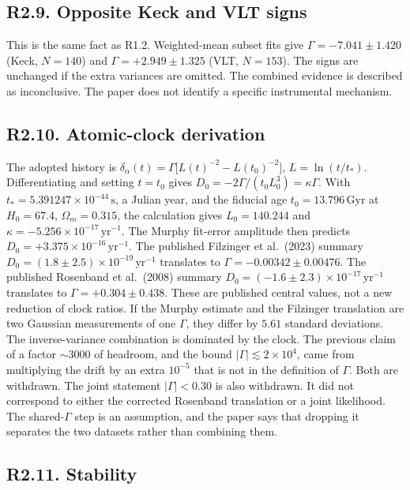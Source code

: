\documentclass[11pt]{article}
\begin{document}
\subsection*{R2.9. Opposite Keck and VLT signs}

This is the same fact as R1.2.
Weighted-mean subset fits give $\Gamma=-7.041\pm1.420$ (Keck, $N=140$) and $\Gamma=+2.949\pm1.325$ (VLT, $N=153$).
The signs are unchanged if the extra variances are omitted.
The combined evidence is described as inconclusive.
The paper does not identify a specific instrumental mechanism.

\subsection*{R2.10. Atomic-clock derivation}

The adopted history is
$\delta_{\alpha}(t)=\Gamma\big[L(t)^{-2}-L(t_{0})^{-2}\big]$,
$L=\ln(t/t_{*})$.
Differentiating and setting $t=t_{0}$ gives
$D_{0}=-2\Gamma/(t_{0} L_{0}^{3})=\kappa\Gamma$.
With $t_{*}=5.391247\times10^{-44}\,\mathrm{s}$, a Julian year, and the fiducial age $t_{0}=13.796\,\mathrm{Gyr}$ at $H_{0}=67.4$, $\Omega_{m}=0.315$, the calculation gives $L_{0}=140.244$ and $\kappa=-5.256\times10^{-17}\,\mathrm{yr}^{-1}$.
The Murphy fit-error amplitude then predicts $D_{0}=+3.375\times10^{-16}\,\mathrm{yr}^{-1}$.
The published Filzinger et al.\ (2023) summary $D_{0}=(1.8\pm2.5)\times10^{-19}\,\mathrm{yr}^{-1}$ translates to $\Gamma=-0.00342\pm0.00476$.
The published Rosenband et al.\ (2008) summary $D_{0}=(-1.6\pm2.3)\times10^{-17}\,\mathrm{yr}^{-1}$ translates to $\Gamma=+0.304\pm0.438$.
These are published central values, not a new reduction of clock ratios.
If the Murphy estimate and the Filzinger translation are two Gaussian measurements of one $\Gamma$, they differ by $5.61$ standard deviations.
The inverse-variance combination is dominated by the clock.
The previous claim of a factor $\sim3000$ of headroom, and the bound $|\Gamma|\lesssim2\times10^{4}$, came from multiplying the drift by an extra $10^{-5}$ that is not in the definition of $\Gamma$.
Both are withdrawn.
The joint statement $|\Gamma|<0.30$ is also withdrawn.
It did not correspond to either the corrected Rosenband translation or a joint likelihood.
The shared-$\Gamma$ step is an assumption, and the paper says that dropping it separates the two datasets rather than combining them.

\subsection*{R2.11. Stability}
\end{document}
